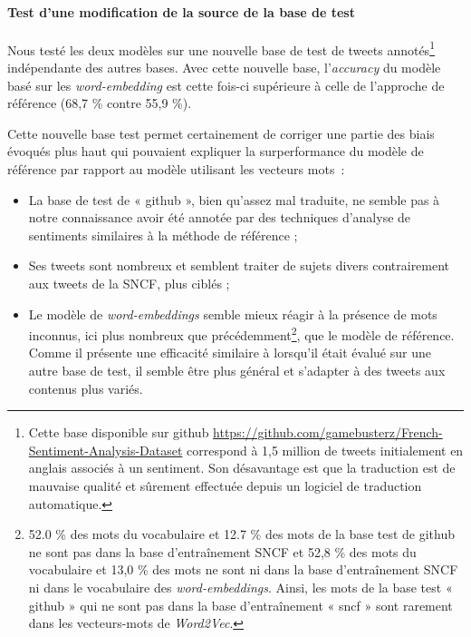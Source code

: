 \documentclass[11pt,french,french]{article}
\let\rmarkdownfootnote\footnote%
\def\footnote{\protect\rmarkdownfootnote}
\begin{document}
\hypertarget{test-dune-modification-de-la-source-de-la-base-de-test}{%
\paragraph{Test d'une modification de la source de la base de test}\label{test-dune-modification-de-la-source-de-la-base-de-test}}

Nous testé les deux modèles sur une nouvelle base de test de tweets annotés\footnote{Cette base disponible sur github \url{https://github.com/gamebusterz/French-Sentiment-Analysis-Dataset} correspond à 1,5 million de tweets initialement en anglais associés à un sentiment. Son désavantage est que la traduction est de mauvaise qualité et sûrement effectuée depuis un logiciel de traduction automatique.} indépendante des autres bases.
Avec cette nouvelle base, l'\emph{accuracy} du modèle basé sur les \emph{word-embedding} est cette fois-ci supérieure à celle de l'approche de référence (68,7 \% contre 55,9 \%).

Cette nouvelle base test permet certainement de corriger une partie des biais évoqués plus haut qui pouvaient expliquer la surperformance du modèle de référence par rapport au modèle utilisant les vecteurs mots~:

\begin{itemize}
\item
  La base de test de « github », bien qu'assez mal traduite, ne semble pas à notre connaissance avoir été annotée par des techniques d'analyse de sentiments similaires à la méthode de référence ;
\item
  Ses tweets sont nombreux et semblent traiter de sujets divers contrairement aux tweets de la SNCF, plus ciblés ;
\item
  Le modèle de \emph{word-embeddings} semble mieux réagir à la présence de mots inconnus, ici plus nombreux que précédemment\footnote{52.0 \% des mots du vocabulaire et 12.7 \% des mots de la base test de github ne sont pas dans la base d'entraînement SNCF et 52,8 \% des mots du vocabulaire et 13,0 \% des mots ne sont ni dans la base d'entraînement SNCF ni dans le vocabulaire des \emph{word-embeddings}. Ainsi, les mots de la base test « github » qui ne sont pas dans la base d'entraînement « sncf » sont rarement dans les vecteurs-mots de \emph{Word2Vec}.}, que le modèle de référence. Comme il présente une efficacité similaire à lorsqu'il était évalué sur une autre base de test, il semble être plus général et s'adapter à des tweets aux contenus plus variés.
\end{itemize}
\end{document}
